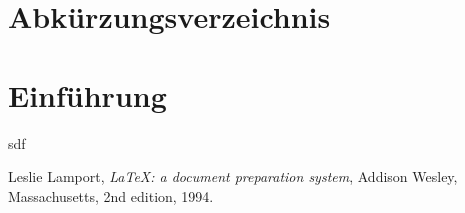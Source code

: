 \documentclass[11pt,a4paper,bibtotocnumbered]{scrreprt}
\begin{document}
\begin{singlespace}

\setcounter{page}{1}
\end{singlespace}

\tableofcontents
\listoffigures
\listoftables

\chapter*{Abkürzungsverzeichnis} 

\begin{acronym}[LAENGE]
\end{acronym}

\cleardoublepage




\chapter{Einführung} 

sdf
 







\begin{singlespace}
\begin{thebibliography}{9}

  Leslie Lamport,
  \emph{\LaTeX: a document preparation system},
  Addison Wesley, Massachusetts,
  2nd edition,
  1994.

\end{thebibliography}
\end{singlespace}
\end{document}
